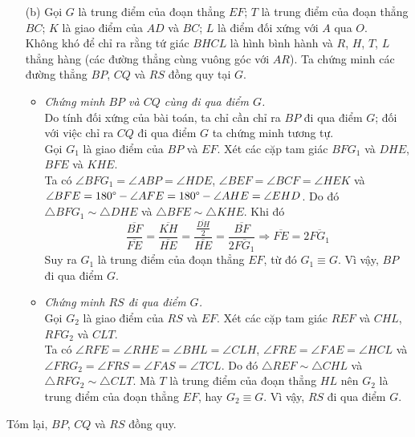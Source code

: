 \begin{solution}
\begin{itemize}
                \item[(b)] Gọi \(G\) là trung điểm của đoạn thẳng \(EF\); \(T\) là trung điểm của đoạn thẳng \(BC\); \(K\) là giao điểm của \(AD\) và \(BC\); \(L\) là điểm đối xứng với \(A\) qua \(O\).\\
                Không khó để chỉ ra rằng tứ giác \(BHCL\) là hình bình hành và \(R\), \(H\), \(T\), \(L\) thẳng hàng (các đường thẳng cùng vuông góc với \(AR\)). Ta chứng minh các đường thẳng \(BP\), \(CQ\) và \(RS\) đồng quy tại \(G\).
                \begin{itemize}
                    \item \textit{Chứng minh \(BP\) và \(CQ\) cùng đi qua điểm \(G\).}\\
                    Do tính đối xứng của bài toán, ta chỉ cần chỉ ra \(BP\) đi qua điểm \(G\); đối với việc chỉ ra \(CQ\) đi qua điểm \(G\) ta chứng minh tương tự.\\
                    Gọi \(G_1\) là giao điểm của \(BP\) và \(EF\). Xét các cặp tam giác \(BFG_1\) và \(DHE\), \(BFE\) và \(KHE\).\\
                    Ta có \(\angle BFG_1 = \angle ABP = \angle HDE\), \(\angle BEF = \angle BCF = \angle HEK\) và \(\angle BFE = 180 \degree - \angle AFE = 180 \degree - \angle AHE = \angle EHD\). Do đó \(\triangle BFG_1 \sim \triangle DHE\) và \(\triangle BFE \sim \triangle KHE\). Khi đó
                    \[\frac{\overline{BF}}{\overline{FE}} = \frac{\overline{KH}}{\overline{HE}} = \frac{\frac{\overline{DH}}{2}}{\overline{HE}} = \frac{\overline{BF}}{2\overline{FG_1}} \Rightarrow \overline{FE} = 2\overline{FG_1}\]
                    Suy ra \(G_1\) là trung điểm của đoạn thẳng \(EF\), từ đó \(G_1 \equiv G\). Vì vậy, \(BP\) đi qua điểm \(G\).
                    \item \textit{Chứng minh \(RS\) đi qua điểm \(G\).}\\
                    Gọi \(G_2\) là giao điểm của \(RS\) và \(EF\). Xét các cặp tam giác \(REF\) và \(CHL\), \(RFG_2\) và \(CLT\).\\
                    Ta có \(\angle RFE = \angle RHE = \angle BHL = \angle CLH\), \(\angle FRE = \angle FAE = \angle HCL\) và \(\angle FRG_2 = \angle FRS = \angle FAS = \angle TCL\). Do đó \(\triangle REF \sim \triangle CHL\) và \(\triangle RFG_2 \sim \triangle CLT\). Mà \(T\) là trung điểm của đoạn thẳng \(HL\) nên \(G_2\) là trung điểm của đoạn thẳng \(EF\), hay \(G_2 \equiv G\). Vì vậy, \(RS\) đi qua điểm \(G\).
                \end{itemize}
            \end{itemize}
            \hspace{0.8cm} Tóm lại, \(BP\), \(CQ\) và \(RS\) đồng quy.
        \end{solution}

